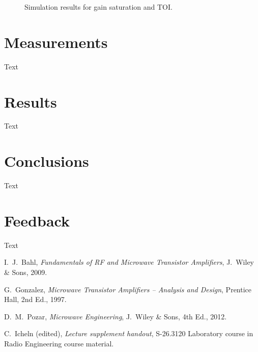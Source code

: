 \documentclass[a4paper, 12pt]{article}
\begin{document}
\begin{figure}[!h]

	\caption{Simulation results for gain saturation and TOI.}
	\label{f:hb}
\end{figure}

\newpage
\section{Measurements}

Text

\newpage
\section{Results}

Text

\newpage
\section{Conclusions}

Text

\newpage
\section{Feedback}

Text


\newpage
\begin{thebibliography}{9}%
	
 I.\ J.\ Bahl, 
	\textit{Fundamentals of RF and Microwave Transistor Amplifiers},
	J.\ Wiley \& Sons, 2009.

 G.\ Gonzalez, 
	\textit{Microwave Transistor Amplifiers -- Analysis and Design},
	Prentice Hall, 2nd Ed., 1997.
	
 D.\ M.\ Pozar, 
	\textit{Microwave Engineering}, 
	J.\ Wiley \& Sons, 4th Ed., 2012.
	
 C.\ Icheln (edited), 
	\textit{Lecture supplement handout},
	S-26.3120 Laboratory course in Radio Engineering course material.

\end{thebibliography}
\end{document}
